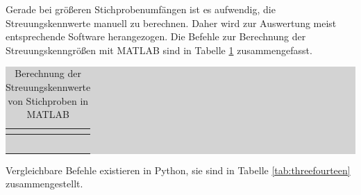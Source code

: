 \noindent Gerade bei gr\"{o}{\ss}eren Stichprobenumf\"{a}ngen ist es aufwendig, die Streuungskennwerte manuell zu berechnen. Daher wird zur Auswertung meist entsprechende Software herangezogen. Die Befehle zur Berechnung der Streuungskenngr\"{o}{\ss}en mit MATLAB sind in Tabelle \ref{tab:threethirteen} zusammengefasst.

\begin{table}[H]
\setlength{\arrayrulewidth}{.1em}
\caption{Berechnung der Streuungskennwerte von Stichproben in MATLAB}
\setlength{\fboxsep}{0pt}%
\colorbox{lightgray}{%
%
\begin{tabular}{| c | c |}
\hline
\parbox[c][0.3in][c]{3.3in}{\smallskip\centering\textbf{\selectfont{Streuungskennwert}}} & 
\parbox[c][0.3in][c]{3.3in}{\smallskip\centering\textbf{\selectfont{MATLAB-Befehl}}}\\ \hline

\parbox[c][0.3in][c]{3.3in}{\centering{}\selectfont{Spannweite}} & 
\parbox[c][0.3in][c]{3.3in}{\centering{}\selectfont{range(x) oder max(x)-min(x)}}\\ \hline

\parbox[c][0.3in][c]{3.3in}{\centering{}\selectfont{Varianz}} & 
\parbox[c][0.3in][c]{3.3in}{\centering{}\selectfont{var(x)}}\\ \hline

\parbox[c][0.3in][c]{3.3in}{\centering{}\selectfont{Standardabweichung}} & 
\parbox[c][0.3in][c]{3.3in}{\centering{}\selectfont{std(x)}}\\ \hline

\parbox[c][0.3in][c]{3.3in}{\centering{}\selectfont{p-Quantil}} & 
\parbox[c][0.3in][c]{3.3in}{\centering{}\selectfont{quantile(x,p)}}\\ \hline

\parbox[c][0.3in][c]{3.3in}{\centering{}\selectfont{Interquartilabstand}} & 
\parbox[c][0.3in][c]{3.3in}{\centering{}\selectfont{iqr(x)}}\\ \hline

\end{tabular}%
}
\label{tab:threethirteen}
\end{table}

\clearpage

\noindent Vergleichbare Befehle existieren in Python, sie sind in Tabelle \ref{tab:threefourteen} zusammengestellt.

